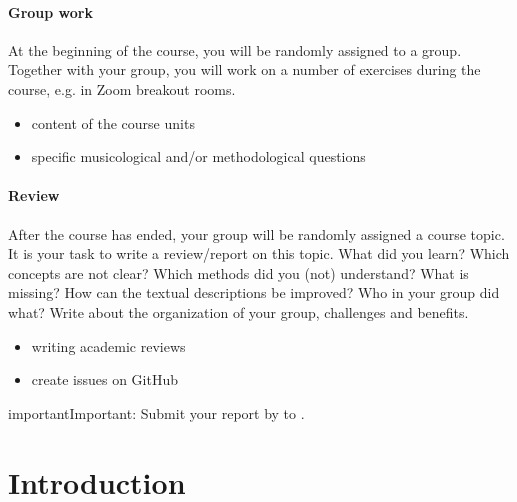 \documentclass[letterpaper,10pt,english]{sphinxmanual}
\begin{document}
\subsubsection*{Group work}

At the beginning of the course, you will be randomly assigned to a group.
Together with your group, you will work on a number of exercises during the course,
e.g. in Zoom breakout rooms.
\begin{itemize}
\item {} 
content of the course units

\item {} 
specific musicological and/or methodological questions

\end{itemize}
\subsubsection*{Review}

After the course has ended, your group will be randomly assigned a course topic.
It is your task to write a review/report on this topic.
What did you learn? Which concepts are not clear? Which methods did you (not) understand?
What is missing? How can the textual descriptions be improved? Who in your group did what?
Write about the organization of your group, challenges and benefits.
\begin{itemize}
\item {} 
writing academic reviews

\item {} 
create issues on GitHub

\end{itemize}

\begin{sphinxadmonition}{important}{Important:}
Submit your report by  to .
\end{sphinxadmonition}


\chapter{Introduction}
\label{\detokenize{2_introduction:introduction}}\label{\detokenize{2_introduction::doc}}
\end{document}
